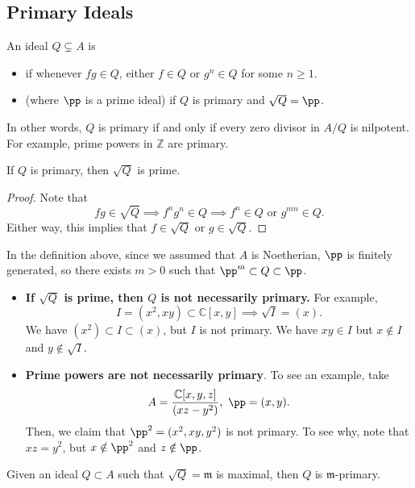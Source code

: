 \subsection{Primary Ideals}
\begin{definition}
    An ideal $Q\subsetneq A$ is 
    \begin{itemize}
        \item {}
    if whenever $fg\in Q$, either $f\in Q$ or $g^n\in Q$
    for some $n\geq 1$.
        \item {} (where $\pp$ is a prime ideal) if $Q$ is primary and $\sqrt Q=\pp$.
    \end{itemize}
\end{definition}
In other words, $Q$ is primary if and only if
every zero divisor in $A/Q$ is nilpotent.
For example, prime powers in $\mathbb Z$ are primary.
\begin{lemma}
    If $Q$ is primary, then $\sqrt Q$ is prime.
\end{lemma}
\begin{proof}
    Note that 
    $$fg\in\sqrt Q\implies f^ng^n\in Q
    \implies f^n\in Q\text{ or } g^{mn}\in Q.$$
    Either way, this implies that $f\in\sqrt Q$
    or $g\in\sqrt Q$.
\end{proof}
In the definition above, since we assumed that $A$ is Noetherian,
$\pp$ is finitely generated,
so there exists $m>0$ such that $\pp^m\subset Q\subset\pp$.
\begin{warn}
\label{warn:primary_ideals}
\begin{itemize}
\item \textbf{If $\sqrt Q$ is prime, then $Q$ is 
not necessarily primary.}
For example,
$$I = (x^2,xy)\subset\mathbb C[x,y] \implies \sqrt I = (x).$$
We have $(x^2)\subset I\subset (x)$, but $I$ is not primary.
We have $xy\in I$ but $x\notin I$ and $y\notin\sqrt I$.
\item \textbf{Prime powers are not necessarily
primary}. To see an example, take
$$A = \frac{\mathbb C[x,y,z]}{(xz-y^2)},\ \pp=(x,y).$$
Then, we claim that $\pp^2 = (x^2, xy, y^2)$ is not primary.
To see why, note that $xz = y^2$,
but $x\notin\pp^2$ and $z\notin\pp$.
\end{itemize}
\end{warn}
\begin{proposition}
    \label{prop:max_ideal_primary}
    Given an ideal $Q\subset A$ such that $\sqrt Q = \mathfrak m$
    is maximal, then $Q$ is $\mathfrak m$-primary.
\end{proposition}
